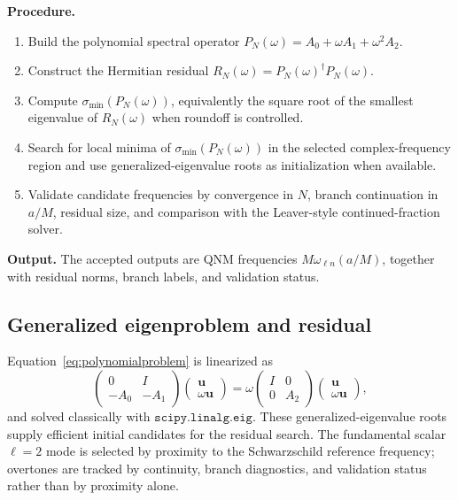 \documentclass[10pt,letterpaper,twocolumn]{article}
\begin{document}
\textbf{Procedure.}
\begin{enumerate}
\item Build the polynomial spectral operator \(P_N(\omega)=A_0+\omega A_1+\omega^2A_2\).
\item Construct the Hermitian residual \(R_N(\omega)=P_N(\omega)^\dagger P_N(\omega)\).
\item Compute \(\sigma_{\min}(P_N(\omega))\), equivalently the square root of the smallest eigenvalue of \(R_N(\omega)\) when roundoff is controlled.
\item Search for local minima of \(\sigma_{\min}(P_N(\omega))\) in the selected complex-frequency region and use generalized-eigenvalue roots as initialization when available.
\item Validate candidate frequencies by convergence in \(N\), branch continuation in \(a/M\), residual size, and comparison with the Leaver-style continued-fraction solver.
\end{enumerate}

\textbf{Output.} The accepted outputs are QNM frequencies \(M\omega_{\ell n}(a/M)\), together with residual norms, branch labels, and validation status.

\subsection{Generalized eigenproblem and residual}

Equation~\eqref{eq:polynomialproblem} is linearized as
\begin{equation}
\begin{pmatrix}
0&I\\
-A_0&-A_1
\end{pmatrix}
\begin{pmatrix}
\bm{u}\\
\omega\bm{u}
\end{pmatrix}
=
\omega
\begin{pmatrix}
I&0\\
0&A_2
\end{pmatrix}
\begin{pmatrix}
\bm{u}\\
\omega\bm{u}
\end{pmatrix},
\label{eq:linearizedspectral}
\end{equation}
and solved classically with \(\texttt{scipy.linalg.eig}\). These generalized-eigenvalue roots supply efficient initial candidates for the residual search. The fundamental scalar \(\ell=2\) mode is selected by proximity to the Schwarzschild reference frequency; overtones are tracked by continuity, branch diagnostics, and validation status rather than by proximity alone.
\end{document}
